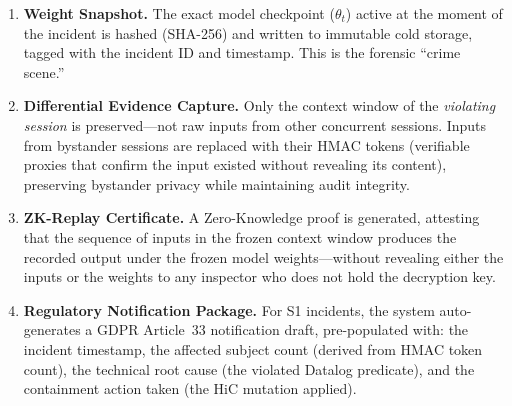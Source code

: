 \begin{enumerate}
  \item \textbf{Weight Snapshot.} The exact model checkpoint ($\theta_t$) active at the moment of the incident is hashed (SHA-256) and written to immutable cold storage, tagged with the incident ID and timestamp. This is the forensic ``crime scene.''
  \item \textbf{Differential Evidence Capture.} Only the context window of the \emph{violating session} is preserved---not raw inputs from other concurrent sessions. Inputs from bystander sessions are replaced with their HMAC tokens (verifiable proxies that confirm the input existed without revealing its content), preserving bystander privacy while maintaining audit integrity.
  \item \textbf{ZK-Replay Certificate.} A Zero-Knowledge proof is generated, attesting that the sequence of inputs in the frozen context window produces the recorded output under the frozen model weights---without revealing either the inputs or the weights to any inspector who does not hold the decryption key.
  \item \textbf{Regulatory Notification Package.} For S1 incidents, the system auto-generates a GDPR Article~33 notification draft, pre-populated with: the incident timestamp, the affected subject count (derived from HMAC token count), the technical root cause (the violated Datalog predicate), and the containment action taken (the HiC mutation applied).
\end{enumerate}


